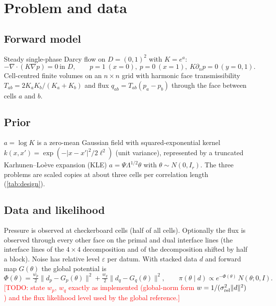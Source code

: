 \documentclass[11pt]{article}
\newcommand{\todo}[1]{\textcolor{red}{[TODO: #1]}}
\begin{document}
\section{Problem and data}\label{sec:problem}
\subsection{Forward model}
Steady single-phase Darcy flow on $D=(0,1)^2$ with $K=e^{a}$:
\begin{equation}
-\nabla\!\cdot\!(K\nabla p)=0\ \text{in }D,\qquad p=1\ (x=0),\ p=0\ (x=1),\ K\partial_n p=0\ (y=0,1).
\end{equation}
Cell-centred finite volumes on an $n\times n$ grid with harmonic face transmissibility $T_{ab}=2K_aK_b/(K_a+K_b)$ and flux $q_{ab}=T_{ab}(p_a-p_b)$ through the face between cells $a$ and $b$.

\subsection{Prior}
$a=\log K$ is a zero-mean Gaussian field with squared-exponential kernel $k(x,x')=\exp(-|x-x'|^2/2\ell^2)$ (unit variance), represented by a truncated Karhunen--Lo\`eve expansion (KLE) $a=\Psi\Lambda^{1/2}\theta$ with $\theta\sim N(0,I_r)$. The three problems are scaled copies at about three cells per correlation length (\cref{tab:design}).

\subsection{Data and likelihood}
Pressure is observed at checkerboard cells (half of all cells). Optionally the flux is observed through every other face on the primal and dual interface lines (the interface lines of the $4\times4$ decomposition and of the decomposition shifted by half a block). Noise has relative level $\varepsilon$ per datum. With stacked data $d$ and forward map $G(\theta)$ the global potential is
\begin{equation}
\Phi(\theta)=\tfrac{w_p}{2}\|d_p-G_p(\theta)\|^2+\tfrac{w_q}{2}\|d_q-G_q(\theta)\|^2,\qquad \pi(\theta\mid d)\propto e^{-\Phi(\theta)}\,N(\theta;0,I).
\end{equation}
\todo{state $w_p$, $w_q$ exactly as implemented (global-norm form $w=1/(\sigma_{\rm rel}^2\|d\|^2)$) and the flux likelihood level used by the global reference.}
\end{document}

